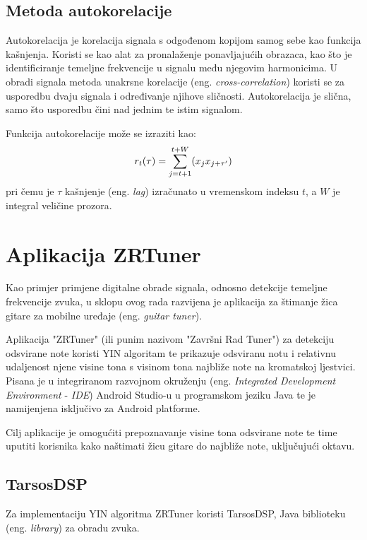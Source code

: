 \documentclass[times, utf8, zavrsni, numeric]{fer}
\begin{document}
\section{Metoda autokorelacije}
Autokorelacija je korelacija signala s odgođenom kopijom samog sebe kao funkcija kašnjenja.\cite{de2002yin} Koristi se kao alat za pronalaženje ponavljajućih obrazaca, kao što je identificiranje temeljne frekvencije u signalu među njegovim harmonicima. U obradi signala metoda unakrsne korelacije (eng. \textit{cross-correlation}) koristi se za usporedbu dvaju signala i određivanje njihove sličnosti. Autokorelacija je slična, samo što usporedbu čini nad jednim te istim signalom.

Funkcija autokorelacije može se izraziti kao:
\begin{equation}
	r_t(\tau) = \sum_{j=t+1}^{t+W} (x_jx_{j+\tau'})\\
\end{equation}
pri čemu je $\tau$ kašnjenje (eng. \textit{lag}) izračunato u vremenskom indeksu $t$, a $W$ je integral veličine prozora.\cite{de2002yin}

%

\chapter{Aplikacija ZRTuner}
Kao primjer primjene digitalne obrade signala, odnosno detekcije temeljne frekvencije zvuka, u sklopu ovog rada razvijena je aplikacija za štimanje žica gitare za mobilne uređaje (eng. \textit{guitar tuner}).

Aplikacija "ZRTuner" (ili punim nazivom "Završni Rad Tuner") za detekciju odsvirane note koristi YIN algoritam te prikazuje odsviranu notu i relativnu udaljenost njene visine tona s visinom tona najbliže note na kromatskoj ljestvici. Pisana je u integriranom razvojnom okruženju (eng. \textit{Integrated Development Environment} - \textit{IDE}) Android Studio-u u programskom jeziku Java te je namijenjena isključivo za Android platforme.

Cilj aplikacije je omogućiti prepoznavanje visine tona odsvirane note te time uputiti korisnika kako naštimati žicu gitare do najbliže note, uključujući oktavu.

\section{TarsosDSP}
Za implementaciju YIN algoritma ZRTuner koristi TarsosDSP, Java biblioteku (eng. \textit{library}) za obradu zvuka.\cite{six2014tarsosdsp}
\end{document}
